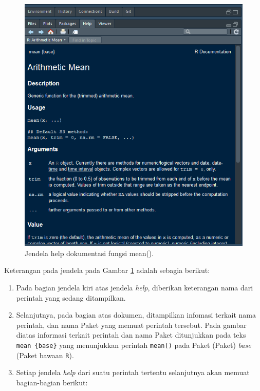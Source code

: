 \documentclass[]{book}
\providecommand{\tightlist}{%
  \setlength{\itemsep}{0pt}\setlength{\parskip}{0pt}}
\theoremstyle{definition}
\theoremstyle{definition}
\theoremstyle{definition}
\theoremstyle{remark}
\begin{document}
\begin{figure}

{\centering \includegraphics[width=0.5\linewidth]{./images/meandoc} 

}

\caption{Jendela help dokumentasi fungsi mean().}\label{fig:meandoc}
\end{figure}

Keterangan pada jendela pada Gambar \ref{fig:meandoc} adalah sebagia berikut:

\begin{enumerate}
\def\labelenumi{\arabic{enumi}.}
\tightlist
\item
  Pada bagian jendela kiri atas jendela \emph{help}, diberikan keterangan nama dari perintah yang sedang ditampilkan.
\item
  Selanjutnya, pada bagian atas dokumen, ditampilkan infomasi terkait nama perintah, dan nama Paket yang memuat perintah tersebut. Pada gambar diatas informasi terkait perintah dan nama Paket ditunjukkan pada teks \texttt{mean\ \{base\}} yang menunjukkan perintah \texttt{mean()} pada Paket (Paket) \emph{base} (Paket bawaan \texttt{R}).
\item
  Setiap jendela \emph{help} dari suatu perintah tertentu selanjutnya akan memuat bagian-bagian berikut:
\end{enumerate}
\end{document}
